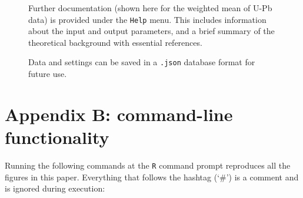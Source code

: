 \documentclass{article}
\begin{document}
\begin{figure}[!ht]
  \centering
  \label{fig:help}
  \caption{Further documentation (shown here for the weighted mean of
    U-Pb data) is provided under the \texttt{Help} menu. This includes
    information about the input and output parameters, and a brief
    summary of the theoretical background with essential references.}
\end{figure}

\begin{figure}[!ht]
  \centering
  \label{fig:json}
  \caption{Data and settings can be saved in a \texttt{.json} database
    format for future use.}
\end{figure}

\clearpage

\section*{Appendix B: command-line functionality}

Running the following commands at the \texttt{R} command prompt
reproduces all the figures in this paper. Everything that follows the
hashtag (`\#') is a comment and is ignored during execution:
\end{document}
